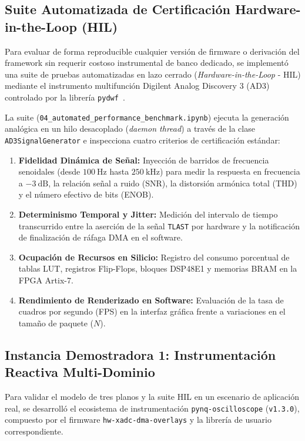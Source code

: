 \documentclass[standalone]{subfiles}
\begin{document}
\subsection{Suite Automatizada de Certificación Hardware-in-the-Loop (HIL)}
\label{subsec:suite_certificacion_hil}

Para evaluar de forma reproducible cualquier versión de firmware o derivación del framework sin requerir costoso instrumental de banco dedicado, se implementó una suite de pruebas automatizadas en lazo cerrado (\textit{Hardware-in-the-Loop} - HIL) mediante el instrumento multifunción Digilent Analog Discovery 3 (AD3) controlado por la librería \texttt{pydwf}~\cite{digilent_waveforms_sdk}.

La suite (\texttt{04\_automated\_performance\_}\allowbreak\texttt{benchmark.ipynb}) ejecuta la generación analógica en un hilo desacoplado (\textit{daemon thread}) a través de la clase \texttt{AD3SignalGenerator} e inspecciona cuatro criterios de certificación estándar:
\begin{enumerate}
    \item \textbf{Fidelidad Dinámica de Señal:} Inyección de barridos de frecuencia senoidales (desde $100~\text{Hz}$ hasta $250~\text{kHz}$) para medir la respuesta en frecuencia a $-3~\text{dB}$, la relación señal a ruido (SNR), la distorsión armónica total (THD) y el número efectivo de bits (ENOB).
    \item \textbf{Determinismo Temporal y Jitter:} Medición del intervalo de tiempo transcurrido entre la aserción de la señal \texttt{TLAST} por hardware y la notificación de finalización de ráfaga DMA en el software.
    \item \textbf{Ocupación de Recursos en Silicio:} Registro del consumo porcentual de tablas LUT, registros Flip-Flops, bloques DSP48E1 y memorias BRAM en la FPGA Artix-7.
    \item \textbf{Rendimiento de Renderizado en Software:} Evaluación de la tasa de cuadros por segundo (FPS) en la interfaz gráfica frente a variaciones en el tamaño de paquete ($N$).
\end{enumerate}

\subsection{Instancia Demostradora 1: Instrumentación Reactiva Multi-Dominio}
\label{subsec:demostrador_instrumento}

Para validar el modelo de tres planos y la suite HIL en un escenario de aplicación real, se desarrolló el ecosistema de instrumentación \texttt{pynq-oscilloscope} (\texttt{v1.3.0}), compuesto por el firmware \texttt{hw-xadc-dma-overlays} y la librería de usuario correspondiente.
\end{document}
